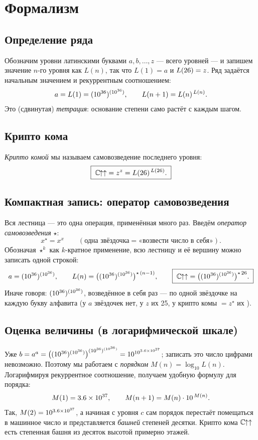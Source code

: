 \section{Формализм}

\subsection{Определение ряда}
Обозначим уровни латинскими буквами \(a, b, \dots, z\) --- всего \nlevels{} уровней ---
и запишем значение \(n\)-го уровня как \(L(n)\), так что \(L(1)=a\) и \(L(26)=z\).
Ряд задаётся начальным значением и рекуррентным соотношением:
\[
  a = L(1) = (10^{36})^{(10^{36})}, \qquad L(n+1) = L(n)^{\,L(n)}.
\]
Это (сдвинутая) \emph{тетрация}: основание степени само растёт с каждым шагом.

\subsection{Крипто кома}
\emph{Крипто комой} мы называем самовозведение последнего уровня:
\[
  \boxed{\;\mathbb{C}\mkern-1.5mu{\uparrow\uparrow} = z^{z} = L(26)^{\,L(26)}.\;}
\]

\subsection{Компактная запись: оператор самовозведения}
Вся лестница --- это одна операция, применённая много раз. Введём \emph{оператор
самовозведения} \(\star\):
\[
  x^{\star} = x^{x} \qquad (\text{одна звёздочка} = \text{«возвести число в себя»}).
\]
Обозначая \(\star^{k}\) как \(k\)-кратное применение, всю лестницу и её вершину можно
записать одной строкой:
\[
  a = (10^{36})^{(10^{36})}, \qquad L(n) = \bigl((10^{36})^{(10^{36})}\bigr)^{\star\,(n-1)}, \qquad
  \boxed{\;\mathbb{C}\mkern-1.5mu{\uparrow\uparrow} = \bigl((10^{36})^{(10^{36})}\bigr)^{\star\,26}.\;}
\]
Иначе говоря: \((10^{36})^{(10^{36})}\), возведённое в себя \nlevels{} раз --- по одной звёздочке на
каждую букву алфавита (у \(a\) звёздочек нет, у \(z\) их 25, у крипто комы \(=z^{\star}\)
их \nlevels).

\subsection{Оценка величины (в логарифмической шкале)}
Уже \(b = a^{a} = \bigl((10^{36})^{(10^{36})}\bigr)^{(10^{36})^{(10^{36})}} = 10^{10^{3.6\times10^{37}}}\); записать это число цифрами
невозможно. Поэтому мы работаем с \emph{порядком} \(M(n)=\log_{10}L(n)\). Логарифмируя
рекуррентное соотношение, получаем удобную формулу для порядка:
\[
  M(1) = 3.6\times10^{37}, \qquad M(n+1) = M(n)\cdot 10^{\,M(n)}.
\]
Так, \(M(2) = 10^{3.6\times10^{37}}\), а начиная с уровня \(c\) сам порядок перестаёт помещаться в
машинное число и представляется \emph{башней} степеней десятки. Крипто кома \(\mathbb{C}\mkern-1.5mu{\uparrow\uparrow}\)
есть степенная башня из десяток высотой примерно \ccheight{} этажей.

